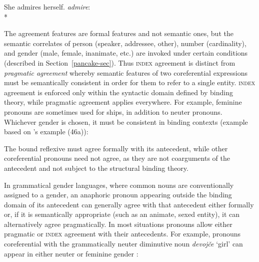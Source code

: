 \documentclass[output=paper
	        ,collection
	        ,collectionchapter
 	        ,biblatex
                ,babelshorthands
                ,newtxmath
                ,draftmode
                ,colorlinks, citecolor=brown
]{langscibook}
\begin{document}
\begin{exe}
\ex  
 \begin{xlist}  \label{admire}
\ex She admires herself.  
\ex \textit{admire}:\\*
\end{xlist}
\end{exe}

\noindent
The agreement features are formal features and not semantic ones, but the semantic correlates of person (speaker, addressee, other), number (cardinality), and gender (male, female, inanimate, etc.) are invoked under certain conditions (described in Section~\ref{pancake-sec}).   
Thus \textsc{index} agreement is distinct from \textit{pragmatic agreement} whereby semantic features of two
coreferential expressions must be semantically consistent in order for them to refer to a single
entity.  \textsc{index} agreement is enforced only within the  syntactic domain defined by binding theory,
while pragmatic agreement applies everywhere.   For example, feminine pronouns are sometimes used
for ships, in addition to neuter pronouns.  Whichever gender is chosen, it must be consistent in
binding contexts (example based on \citeauthor{Pollard+Sag:1994}'s \citeyear[79]{Pollard+Sag:1994} example (46a)):


\begin{exe}
\ex   \label{lurch}
\begin{xlist}
\end{xlist}
\end{exe}

\noindent
The bound reflexive must agree formally with its antecedent, while other
coreferential pronouns need not agree, as they are not coarguments of the antecedent and not subject to the structural binding theory.  

In grammatical gender languages, where common nouns are conventionally assigned to a gender, an anaphoric pronoun appearing outside the binding domain of its antecedent can generally agree with that antecedent either formally or, if it is semantically appropriate (such as an animate, sexed entity), it can alternatively agree pragmatically.  In most situations pronouns allow either pragmatic or \textsc{index} agreement with their
antecedents.  For example, pronouns coreferential with the  grammatically neuter diminutive noun \textit{devoj\v{c}e} `girl' can appear in either neuter or feminine gender \citep[from][198]{Wechsler+Zlatic:2003}:
\end{document}

